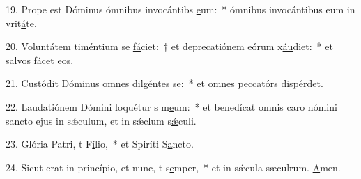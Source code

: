 19. Prope est Dóminus ómnibus invocántibs \uline{e}um:~* ómnibus invocántibus eum in vrit\uline{á}te.\par 
20. Voluntátem timéntium se \uline{fá}ciet:~† et deprecatiónem eórum x\uline{áu}diet:~* et salvos fácet \uline{e}os.\par 
21. Custódit Dóminus omnes dilg\uline{é}ntes se:~* et omnes peccatórs disp\uline{é}rdet.\par 
22. Laudatiónem Dómini loquétur s m\uline{e}um:~* et benedícat omnis caro nómini sancto ejus in sǽculum, et in sǽclum s\uline{ǽ}culi.\par 
23. Glória Patri, t F\uline{í}lio,~* et Spiríti S\uline{a}ncto.\par 
24. Sicut erat in princípio, et nunc, t s\uline{e}mper,~* et in sǽcula sæculrum. \uline{A}men.\par 
